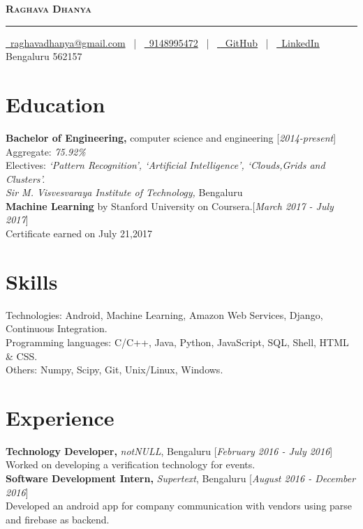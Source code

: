 \documentclass[11pt]{article}
\begin{document}
\thispagestyle{empty}

\begin{center}
\textbf{\textsc{\Huge Raghava Dhanya}}
\rule{\textwidth}{.4pt}
\end{center}

\begin{center}
\href{mailto:raghavadhanya@gmail.com}{\faEnvelope\ raghavadhanya@gmail.com}
\ | \
\href{tel:9148995472}{\faPhoneSquare\ 9148995472}
\ | \
\href{https://github.com/RaghavaDhanya}{ \underline{\faGithubSquare\ GitHub}}
\ | \ 
\href{https://in.linkedin.com/in/raghavadhanya}{\underline{\faLinkedinSquare\ LinkedIn}}
\\
Bengaluru 562157
\end{center}

\section{Education}
\textbf{Bachelor of Engineering,} computer science and engineering \hfill [\textit{2014-present}]\\
Aggregate: \textit{75.92\%}\\
Electives: \textit{`Pattern Recognition', `Artificial Intelligence', `Clouds,Grids and Clusters'.}\\
\textit{Sir M. Visvesvaraya Institute of Technology,} Bengaluru
\medskip\\
\textbf{Machine Learning} by Stanford University on Coursera.\hfill [\textit{March 2017 - July 2017}]\\
Certificate earned on July 21,2017 
\section{Skills}
Technologies: Android, Machine Learning, Amazon Web Services, Django, Continuous Integration.\\
Programming languages: C/C++, Java, Python, JavaScript, SQL, Shell, HTML \& CSS.\\
Others: Numpy, Scipy, Git, Unix/Linux, Windows.



\section{Experience}
\textbf{Technology Developer,} \textit{notNULL}, Bengaluru \hfill [\textit{February 2016 - July 2016}]\\
Worked on developing a verification technology for events.\medskip\\
\textbf{Software Development Intern,} \textit{Supertext}, Bengaluru \hfill [\textit{August 2016 - December 2016}]\\
Developed an android app for company communication with vendors using parse and firebase as backend. 
\end{document}
